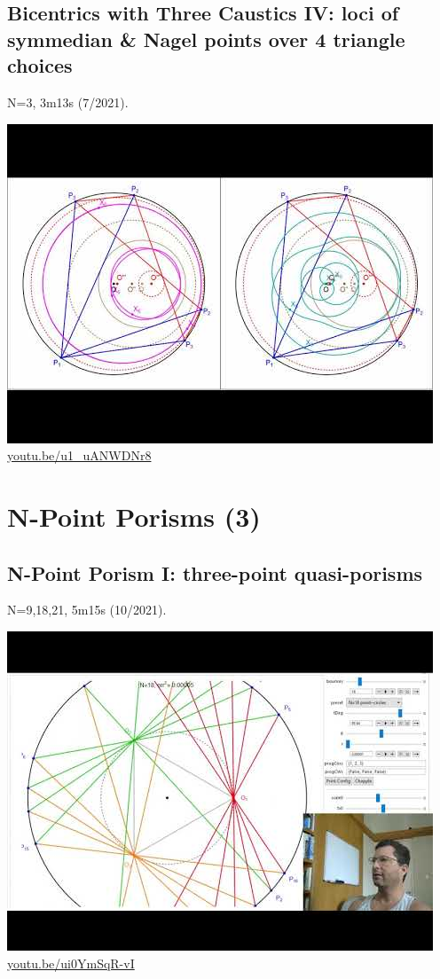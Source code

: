 \documentclass[12pt]{amsart}
\begin{document}
\subsection{Bicentrics with Three Caustics IV: loci of symmedian \& Nagel points over 4 triangle choices}
\label{vid:u1_uANWDNr8}
\noindent N=3, 3m13s (7/2021). 
\begin{center}\includegraphics[width=.5\textwidth]{pics/u1_uANWDNr8.jpg} \\ 
\href{https://youtu.be/u1_uANWDNr8}{\url{youtu.be/u1\_uANWDNr8}}\end{center}
% 


\section{N-Point Porisms (3)}

\subsection{N-Point Porism I: three-point quasi-porisms}
\label{vid:ui0YmSqR-vI}
\noindent N=9,18,21, 5m15s (10/2021). 
\begin{center}\includegraphics[width=.5\textwidth]{pics/ui0YmSqR-vI.jpg} \\ 
\href{https://youtu.be/ui0YmSqR-vI}{\url{youtu.be/ui0YmSqR-vI}}\end{center}
% 
\end{document}
